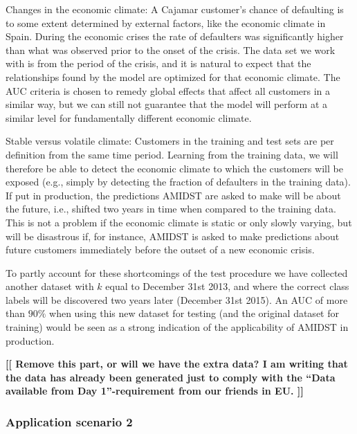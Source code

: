 \documentclass{article}
\theoremstyle{theorem}
\theoremstyle{definition}
\newcommand{\comment}[1]{ \begin{center}{\bf [[ #1 ]]}\end{center}}
\begin{document}
\item[Changes in the economic climate:]  A Cajamar customer's chance of defaulting is to some  extent determined by external factors, like the economic climate in Spain. During the economic crises the rate of defaulters was significantly higher than what was observed prior to the onset of the crisis. The data set we work with is from the period of the crisis, and it is natural to expect that the relationships found by the model are optimized for that economic climate. The AUC criteria is chosen to remedy global effects that affect all customers in a similar way, but we can still not guarantee that the model will perform at a similar level for fundamentally different economic climate.

\item[Stable versus volatile climate:] Customers in the training and test sets are per definition from the same time period. Learning from the training data, we will therefore be able to detect the economic climate to which the customers will be exposed (e.g., simply by detecting the fraction of defaulters in the training data). If put in production, the predictions AMIDST are asked to make will be about the future, i.e., shifted two years in time when compared to the training data. This is not a problem if the economic climate is static or only slowly varying, but will be disastrous if, for instance, AMIDST is asked to make predictions about future customers immediately before the outset of a new economic crisis.

\ede

To partly account for these shortcomings of the test procedure we have collected another dataset with $k$ equal to December 31st 2013, and where the correct class labels will be discovered two years later (December 31st 2015). 
An AUC of more than $90\%$ when using this new dataset for testing (and the original dataset for training) would be seen as a strong indication of the applicability of AMIDST in production.

\comment{Remove this part, or will we have the extra data? I am writing that the data has already been generated just to comply with the ``Data available from Day 1''-requirement from our friends in EU.}






\subsubsection{Application scenario 2}
\end{document}
